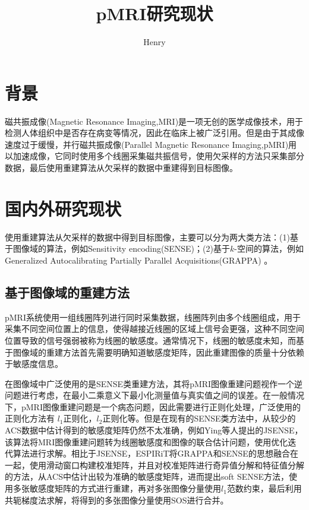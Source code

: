 \documentclass[lang=cn,11pt,a4paper,cite=numbers]{elegantpaper}
\title{pMRI研究现状}
\author{Henry}
\date{\zhtoday}
\begin{document}
\maketitle
\section{背景}
\par 磁共振成像(Magnetic Resonance Imaging,MRI)是一项无创的医学成像技术，用于检测人体组织中是否存在病变等情况，因此在临床上被广泛引用。但是由于其成像速度过于缓慢，并行磁共振成像(Parallel Magnetic Resonance Imaging,pMRI)用以加速成像，它同时使用多个线圈采集磁共振信号，使用欠采样的方法只采集部分数据，最后使用重建算法从欠采样的数据中重建得到目标图像。
\section{国内外研究现状}
\par 使用重建算法从欠采样的数据中得到目标图像，主要可以分为两大类方法：(1)基于图像域的算法，例如Sensitivity encoding(SENSE)\cite{pruessmann1999sense}；(2)基于$k$-空间的算法，例如Generalized Autocalibrating Partially Parallel Acquisitions(GRAPPA) \cite{griswold2002generalized}。

\subsection{基于图像域的重建方法}
\par pMRI系统使用一组线圈阵列进行同时采集数据，线圈阵列由多个线圈组成，用于采集不同空间位置上的信息，使得越接近线圈的区域上信号会更强，这种不同空间位置导致的信号强弱被称为线圈的敏感度。通常情况下，线圈的敏感度未知，而基于图像域的重建方法首先需要明确知道敏感度矩阵，因此重建图像的质量十分依赖于敏感度信息。

\par 在图像域中广泛使用的是SENSE类重建方法，其将pMRI图像重建问题视作一个逆问题进行考虑，在最小二乘意义下最小化测量值与真实值之间的误差。在一般情况下，pMRI图像重建问题是一个病态问题，因此需要进行正则化处理，广泛使用的正则化方法有 $l_1$正则化，$l_2$正则化等。但是在现有的SENSE类方法中，从较少的ACS数据中估计得到的敏感度矩阵仍然不太准确，例如Ying等人提出的JSENSE\cite{ying2007joint}，该算法将MRI图像重建问题转为线圈敏感度和图像的联合估计问题，使用优化迭代算法进行求解。相比于JSENSE，ESPIRiT\cite{uecker2014espirit}将GRAPPA和SENSE的思想融合在一起，使用滑动窗口构建校准矩阵，并且对校准矩阵进行奇异值分解和特征值分解的方法，从ACS中估计出较为准确的敏感度矩阵，进而提出soft SENSE方法，使用多张敏感度矩阵的方式进行重建，再对多张图像分量使用$l_1$范数约束，最后利用共轭梯度法求解，将得到的多张图像分量使用SOS进行合并。
\end{document}
